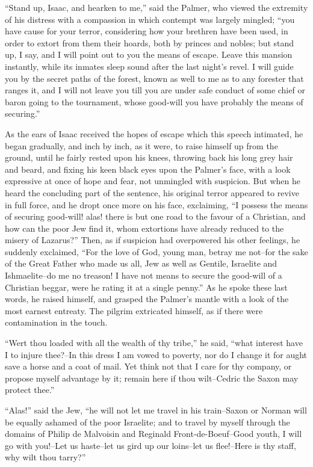 ``Stand up, Isaac, and hearken to me,'' said the Palmer, who viewed the
extremity of his distress with a compassion in which contempt was
largely mingled; ``you have cause for your terror, considering how your
brethren have been used, in order to extort from them their hoards, both
by princes and nobles; but stand up, I say, and I will point out to you
the means of escape. Leave this mansion instantly, while its inmates
sleep sound after the last night's revel. I will guide you by the secret
paths of the forest, known as well to me as to any forester that ranges
it, and I will not leave you till you are under safe conduct of some
chief or baron going to the tournament, whose good-will you have
probably the means of securing.''

As the ears of Isaac received the hopes of escape which this speech
intimated, he began gradually, and inch by inch, as it were, to raise
himself up from the ground, until he fairly rested upon his knees,
throwing back his long grey hair and beard, and fixing his keen black
eyes upon the Palmer's face, with a look expressive at once of hope and
fear, not unmingled with suspicion. But when he heard the concluding
part of the sentence, his original terror appeared to revive in full
force, and he dropt once more on his face, exclaiming, ``I possess
the means of securing good-will! alas! there is but one road to the
favour of a Christian, and how can the poor Jew find it, whom extortions
have already reduced to the misery of Lazarus?'' Then, as if suspicion
had overpowered his other feelings, he suddenly exclaimed, ``For the
love of God, young man, betray me not--for the sake of the Great Father
who made us all, Jew as well as Gentile, Israelite and Ishmaelite--do me
no treason! I have not means to secure the good-will of a Christian
beggar, were he rating it at a single penny.'' As he spoke these last
words, he raised himself, and grasped the Palmer's mantle with a look of
the most earnest entreaty. The pilgrim extricated himself, as if there
were contamination in the touch.

``Wert thou loaded with all the wealth of thy tribe,'' he said, ``what
interest have I to injure thee?--In this dress I am vowed to poverty,
nor do I change it for aught save a horse and a coat of mail. Yet think
not that I care for thy company, or propose myself advantage by it;
remain here if thou wilt--Cedric the Saxon may protect thee.''

``Alas!'' said the Jew, ``he will not let me travel in his train--Saxon
or Norman will be equally ashamed of the poor Israelite; and to travel
by myself through the domains of Philip de Malvoisin and Reginald
Front-de-Boeuf--Good youth, I will go with you!--Let us haste--let us
gird up our loins--let us flee!--Here is thy staff, why wilt thou
tarry?''

